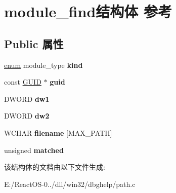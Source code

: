 \hypertarget{structmodule__find}{}\section{module\+\_\+find结构体 参考}
\label{structmodule__find}
\subsection*{Public 属性}
\begin{DoxyCompactItemize}
\item 
\mbox{\label{structmodule__find_adb1082369f8840fb7a480ed1f7eb776a}} 
\hyperlink{interfaceenum}{enum} module\+\_\+type {\bfseries kind}
\item 
\mbox{\label{structmodule__find_a4f1d25dfc85c0fd2be5225db55682a00}} 
const \hyperlink{interface_g_u_i_d}{G\+U\+ID} $\ast$ {\bfseries guid}
\item 
\mbox{\label{structmodule__find_a41f1f1c01763bc7a2fa7fca9db720451}} 
D\+W\+O\+RD {\bfseries dw1}
\item 
\mbox{\label{structmodule__find_a5057bef738878542c13ca5219541b560}} 
D\+W\+O\+RD {\bfseries dw2}
\item 
\mbox{\label{structmodule__find_a217b21e2828a096a2b5da91bbf5a9345}} 
W\+C\+H\+AR {\bfseries filename} \mbox{[}M\+A\+X\+\_\+\+P\+A\+TH\mbox{]}
\item 
\mbox{\label{structmodule__find_a9438f878d9f1504c954f623a5982627a}} 
unsigned {\bfseries matched}
\end{DoxyCompactItemize}


该结构体的文档由以下文件生成\+:\begin{DoxyCompactItemize}
\item 
E\+:/\+React\+O\+S-\/0../dll/win32/dbghelp/path.\+c\end{DoxyCompactItemize}
